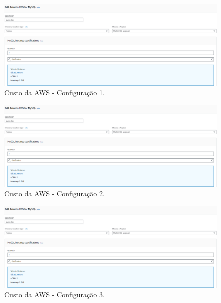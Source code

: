  
\begin{figure}[hp]
    \centering
    
    \includegraphics[scale=0.5]{figures/custo_aws_configuracao.PNG}
    \caption{Custo da AWS - Configuração 1.}
    \label{figure:custo_aws_configuracao_1}
    
\end{figure}

\begin{figure}[hp]
    \centering
    
    \includegraphics[scale=0.5]{figures/custo_aws_configuracao.PNG}
    \caption{Custo da AWS - Configuração 2.}
    \label{figure:custo_aws_configuracao_2}
    
\end{figure}

\begin{figure}[hp]
    \centering
    
    \includegraphics[scale=0.5]{figures/custo_aws_configuracao.PNG}
    \caption{Custo da AWS - Configuração 3.}
    \label{figure:custo_aws_configuracao_3}
    
\end{figure}